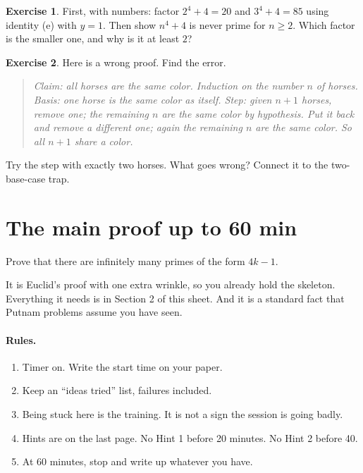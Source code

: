\documentclass[11pt]{article}
\theoremstyle{plain}
\theoremstyle{definition}
\newtheorem{exercise}{Exercise}
\begin{document}
\begin{exercise}
First, with numbers: factor $2^4 + 4 = 20$ and $3^4 + 4 = 85$ using identity (e) with $y = 1$. Then show $n^4 + 4$ is never prime for $n \ge 2$. Which factor is the smaller one, and why is it at least $2$?
\end{exercise}

\begin{exercise}
Here is a wrong proof. Find the error.
\begin{quote}
\textit{Claim: all horses are the same color. Induction on the number $n$ of horses. Basis: one horse is the same color as itself. Step: given $n+1$ horses, remove one; the remaining $n$ are the same color by hypothesis. Put it back and remove a different one; again the remaining $n$ are the same color. So all $n+1$ share a color.}
\end{quote}
Try the step with exactly two horses. What goes wrong? Connect it to the two-base-case trap.
\end{exercise}

\section{The main proof \hfill up to 60 min}

\begin{problem}
Prove that there are infinitely many primes of the form $4k - 1$.
\end{problem}

\begin{why}
It is Euclid's proof with one extra wrinkle, so you already hold the skeleton. Everything it needs is in Section 2 of this sheet. And it is a standard fact that Putnam problems assume you have seen.
\end{why}

\paragraph{Rules.}
\begin{enumerate}
  \item Timer on. Write the start time on your paper.
  \item Keep an ``ideas tried'' list, failures included.
  \item Being stuck here is the training. It is not a sign the session is going badly.
  \item Hints are on the last page. No Hint 1 before 20 minutes. No Hint 2 before 40.
  \item At 60 minutes, stop and write up whatever you have.
\end{enumerate}
\end{document}
